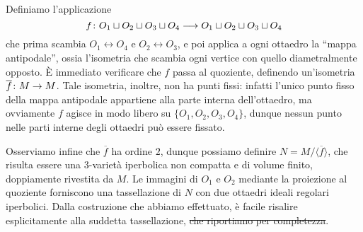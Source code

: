 \vspace{1cm}

Definiamo l'applicazione
\[
\map{f}{O_1\sqcup O_2\sqcup O_3\sqcup O_4}{O_1\sqcup O_2\sqcup O_3\sqcup O_4}
\]
che prima scambia $O_1\leftrightarrow O_4$ e $O_2\leftrightarrow O_3$, e poi applica a ogni ottaedro la ``mappa antipodale'', ossia l'isometria che scambia ogni vertice con quello diametralmente opposto. È immediato verificare che $f$ passa al quoziente, definendo un'isometria $\map{\overline{f}}{M}{M}$. Tale isometria, inoltre, non ha punti fissi: infatti l'unico punto fisso della mappa antipodale appartiene alla parte interna dell'ottaedro, ma ovviamente $f$ agisce in modo libero su $\{O_1,O_2,O_3,O_4\}$, dunque nessun punto nelle parti interne degli ottaedri può essere fissato.

Osserviamo infine che $\overline{f}$ ha ordine $2$, dunque possiamo definire $N=M/\langle\overline{f}\rangle$, che risulta essere una $3$-varietà iperbolica non compatta e di volume finito, doppiamente rivestita da $M$. Le immagini di $O_1$ e $O_2$ mediante la proiezione al quoziente forniscono una tassellazione di $N$ con due ottaedri ideali regolari iperbolici. Dalla costruzione che abbiamo effettuato, è facile risalire esplicitamente alla suddetta tassellazione, \sout{che riportiamo per completezza}.
